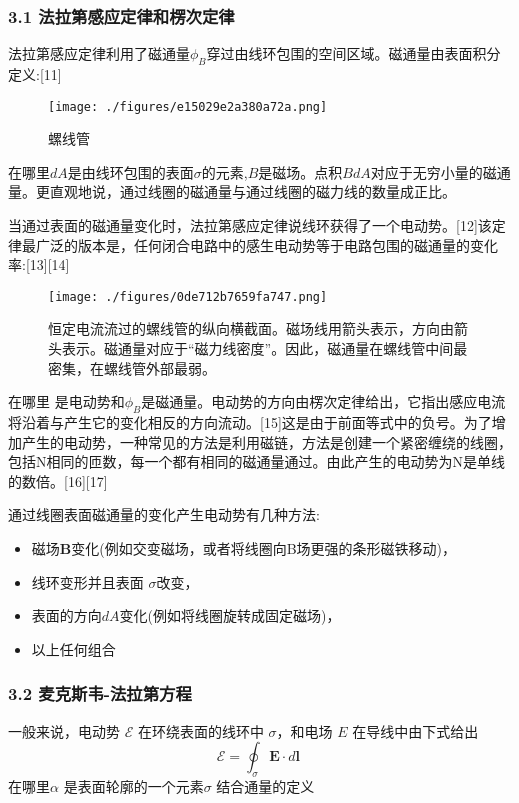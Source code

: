 \subsubsection{3.1 法拉第感应定律和楞次定律}
法拉第感应定律利用了磁通量$\phi_B$穿过由线环包围的空间区域。磁通量由表面积分定义:[11]
\begin{figure}[ht]
\centering
\texttt{[image: ./figures/e15029e2a380a72a.png]}
\caption{螺线管} \label{fig_DCGY_5}
\end{figure}
在哪里$dA$是由线环包围的表面$\sigma$的元素,$B$是磁场。点积$BdA$对应于无穷小量的磁通量。更直观地说，通过线圈的磁通量与通过线圈的磁力线的数量成正比。

当通过表面的磁通量变化时，法拉第感应定律说线环获得了一个电动势。[12]该定律最广泛的版本是，任何闭合电路中的感生电动势等于电路包围的磁通量的变化率:[13][14]
\begin{figure}[ht]
\centering
\texttt{[image: ./figures/0de712b7659fa747.png]}
\caption{恒定电流流过的螺线管的纵向横截面。磁场线用箭头表示，方向由箭头表示。磁通量对应于“磁力线密度”。因此，磁通量在螺线管中间最密集，在螺线管外部最弱。} \label{fig_DCGY_6}
\end{figure}
在哪里  是电动势和$\phi_B$是磁通量。电动势的方向由楞次定律给出，它指出感应电流将沿着与产生它的变化相反的方向流动。[15]这是由于前面等式中的负号。为了增加产生的电动势，一种常见的方法是利用磁链，方法是创建一个紧密缠绕的线圈，包括N相同的匝数，每一个都有相同的磁通量通过。由此产生的电动势为N是单线的数倍。[16][17]

通过线圈表面磁通量的变化产生电动势有几种方法:
\begin{itemize}
\item 磁场$\mathbf B$变化(例如交变磁场，或者将线圈向B场更强的条形磁铁移动)，
\item 线环变形并且表面 $\sigma$改变，
\item 表面的方向$dA$变化(例如将线圈旋转成固定磁场)，
\item 以上任何组合
\end{itemize}
\subsubsection{3.2 麦克斯韦-法拉第方程}
一般来说，电动势 $\mathcal{E}$ 在环绕表面的线环中 $\sigma$，和电场 $E$ 在导线中由下式给出
$$\mathcal{E} = \oint_{\sigma} \mathbf{E} \cdot d\mathbf{l}~$$
在哪里$\alpha$ 是表面轮廓的一个元素$\sigma$ 结合通量的定义

